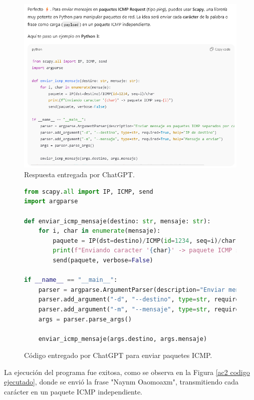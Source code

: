 \documentclass[letter,12pt]{article}
\begin{document}
\begin{figure}[H]
        \centering
        \includegraphics[width=14cm]{actividades/ac2/chatgpt_respuesta.png}
        \caption{Respuesta entregada por ChatGPT.}
        \label{ac2 chatgpt respuesta}
\end{figure}
\begin{figure}[H]
    \centering
    \begin{lstlisting}[language=Python]
from scapy.all import IP, ICMP, send
import argparse

def enviar_icmp_mensaje(destino: str, mensaje: str):
    for i, char in enumerate(mensaje):
        paquete = IP(dst=destino)/ICMP(id=1234, seq=i)/char
        print(f"Enviando caracter '{char}' -> paquete ICMP seq={i}")
        send(paquete, verbose=False)

if __name__ == "__main__":
    parser = argparse.ArgumentParser(description="Enviar mensaje en paquetes ICMP separados por caracteres")
    parser.add_argument("-d", "--destino", type=str, required=True, help="IP de destino")
    parser.add_argument("-m", "--mensaje", type=str, required=True, help="Mensaje a enviar")
    args = parser.parse_args()

    enviar_icmp_mensaje(args.destino, args.mensaje)
    \end{lstlisting}
    \caption{Código entregado por ChatGPT para enviar paquetes ICMP.}
    \label{ac2 codigo}
\end{figure}  

La ejecución del programa fue exitosa, como se observa en la Figura \ref{ac2 codigo ejecutado}, donde se envió la frase "Naynm Oaomoaxm", transmitiendo cada carácter en un paquete ICMP independiente.
\end{document}
